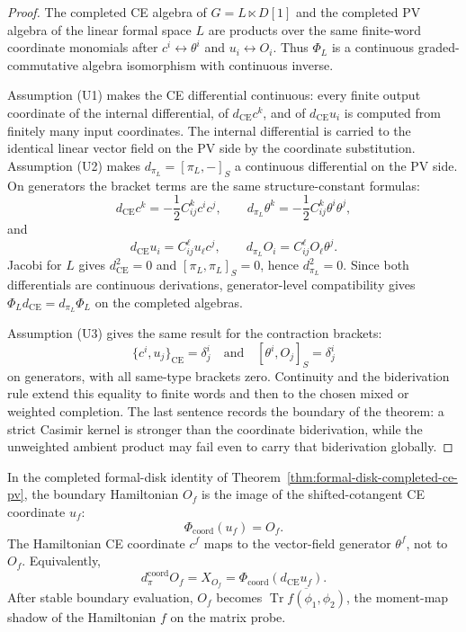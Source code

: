 \begin{proof}
  The completed CE algebra of \(G=L\ltimes D[1]\) and the completed PV
  algebra of the linear formal space \(L\) are products over the same
  finite-word coordinate monomials after \(c^i\leftrightarrow\theta^i\)
  and \(u_i\leftrightarrow O_i\).  Thus \(\Phi_L\) is a continuous
  graded-commutative algebra isomorphism with continuous inverse.

  Assumption (U1) makes the CE differential continuous: every finite
  output coordinate of the internal differential, of
  \(d_{\mathrm{CE}}c^k\), and of \(d_{\mathrm{CE}}u_i\) is computed from
  finitely many input coordinates.  The internal differential is carried
  to the identical linear vector field on the PV side by the coordinate
  substitution.  Assumption (U2) makes \(d_{\pi_L}=[\pi_L,-]_S\) a
  continuous differential on the PV side.  On generators the bracket
  terms are the same structure-constant formulas:
  \[
    d_{\mathrm{CE}}c^k=-\frac12 C^k_{ij}c^ic^j,\qquad
    d_{\pi_L}\theta^k=-\frac12 C^k_{ij}\theta^i\theta^j,
  \]
  and
  \[
    d_{\mathrm{CE}}u_i=C^\ell_{ij}u_\ell c^j,\qquad
    d_{\pi_L}O_i=C^\ell_{ij}O_\ell\theta^j .
  \]
  Jacobi for \(L\) gives \(d_{\mathrm{CE}}^2=0\) and
  \([\pi_L,\pi_L]_S=0\), hence \(d_{\pi_L}^2=0\).  Since both
  differentials are continuous derivations, generator-level
  compatibility gives \(\Phi_Ld_{\mathrm{CE}}=d_{\pi_L}\Phi_L\) on the
  completed algebras.

  Assumption (U3) gives the same result for the contraction brackets:
  \[
    \{c^i,u_j\}_{\mathrm{CE}}=\delta^i_j
    \quad\text{and}\quad
    [\theta^i,O_j]_S=\delta^i_j
  \]
  on generators, with all same-type brackets zero.  Continuity and the
  biderivation rule extend this equality to finite words and then to the
  chosen mixed or weighted completion.  The last sentence records the
  boundary of the theorem: a strict Casimir kernel is stronger than the
  coordinate biderivation, while the unweighted ambient product may fail
  even to carry that biderivation globally.
\end{proof}

\begin{prop}\label{prop:cotangent-coordinate-boundary-hamiltonian}
  In the completed formal-disk identity of
  Theorem~\ref{thm:formal-disk-completed-ce-pv}, the boundary Hamiltonian
  \(O_f\) is the image of the shifted-cotangent CE coordinate \(u_f\):
  \[
	    \Phi_{\mathrm{coord}}(u_f)=O_f.
  \]
  The Hamiltonian CE coordinate \(c^f\) maps to the vector-field
  generator \(\theta^f\), not to \(O_f\).  Equivalently,
  \[
	    d_\pi^{\mathrm{coord}} O_f=X_{O_f}=\Phi_{\mathrm{coord}}(d_{\mathrm{CE}}u_f).
  \]
  After stable boundary evaluation, \(O_f\) becomes
  \(\overline{\operatorname{Tr}f(\phi_1,\phi_2)}\), the moment-map
  shadow of the Hamiltonian \(f\) on the matrix probe.
\end{prop}

